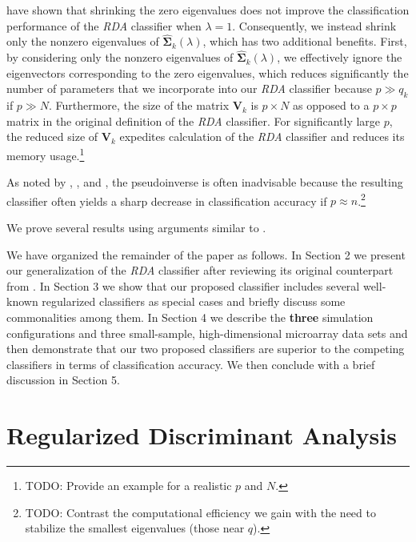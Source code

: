 \documentclass[11pt]{article}
\begin{document}
\cite{Ye:2006jm} have shown that shrinking the zero eigenvalues does not improve the classification performance of the \emph{RDA} classifier when $\lambda = 1$. Consequently, we instead shrink only the nonzero eigenvalues of $\widehat{\bm\Sigma}_k(\lambda)$, which has two additional benefits. First, by considering only the nonzero eigenvalues of $\widehat{\bm\Sigma}_k(\lambda)$, we effectively ignore the eigenvectors corresponding to the zero eigenvalues, which reduces significantly the number of parameters that we incorporate into our \emph{RDA} classifier because $p \gg q_k$ if $p \gg N$. Furthermore, the size of the matrix $\bm V_k$ is $p \times N$ as opposed to a $p \times p$ matrix in the original definition of the \emph{RDA} classifier. For significantly large $p$, the reduced size of $\bm V_k$ expedites calculation of the \emph{RDA} classifier and reduces its memory usage.\footnote{TODO: Provide an example for a realistic $p$ and $N$.}

As noted by \cite{Hoyle:2011vt}, \cite{Raudys:1998dd}, and \cite{Ramey:2011ji}, the pseudoinverse is often inadvisable because the resulting classifier often yields a sharp decrease in classification accuracy if $p \approx n$.\footnote{TODO: Contrast the computational efficiency we gain with the need to stabilize the smallest eigenvalues (those near $q$).}

We prove several results using arguments similar to \cite{Ye:2006tq}.

We have organized the remainder of the paper as follows. In Section 2 we present our generalization of the \emph{RDA} classifier after reviewing its original counterpart from \cite{Friedman:1989tm}. In Section 3 we show that our proposed classifier includes several well-known regularized classifiers as special cases and briefly discuss some commonalities among them. In Section 4 we describe the \textbf{three} simulation configurations and three small-sample, high-dimensional microarray data sets and then demonstrate that our two proposed classifiers are superior to the competing classifiers in terms of classification accuracy. We then conclude with a brief discussion in Section 5.

\section{Regularized Discriminant Analysis}
\end{document}
